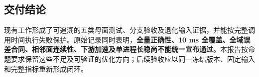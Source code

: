 \documentclass[UTF8,zihao=5,fontset=windows,a4paper]{ctexart}
\begin{document}
\subsection{交付结论}
现有工作形成了可追溯的五类母面测试、分支验收及退化输入证据，并能按完整调用时间执行失败保护。原始记录同时表明，\textbf{全量正确性、10 ms 全覆盖、全域误差合同、相邻面连续性、下游加速及单进程长稳尚不能统一宣布通过}。本报告按命题要求保留这些不足及可验证的优化方向；后续验收应以同一冻结版本、固定输入和完整指标重新形成闭环。
\end{document}
